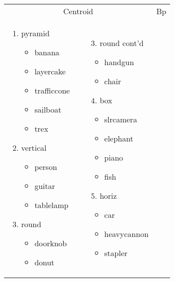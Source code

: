 \documentclass[12pt,twoside]{naturefigs}
\newif\myifpdf
\begin{document}
\begin{figure}
  \begin{tabular}{llll}
   \multicolumn{2}{c}{Centroid} & \multicolumn{2}{c}{Bp} \\
	 \parbox[t]{1.4in}{\raggedright  	{} \small
	\begin{enumerate}
	\item pyramid
	\begin{itemize}[leftmargin=*]
	\item banana
	\item layercake
	\item trafficcone
	\item sailboat
	\item trex
	\end{itemize}
	\item vertical
	\begin{itemize}[leftmargin=*]
	\item person
	\item guitar
	\item tablelamp
	\end{itemize}
	\item round
	\begin{itemize}[leftmargin=*]
	\item doorknob
	\item donut
	\end{itemize}
	\end{enumerate}
	} & 
	 \parbox[t]{1.4in}{\raggedright 	{} \small
	\begin{enumerate}
	\item[3.] round cont'd
	\begin{itemize}[leftmargin=*]
	\item handgun
	\item chair
	\end{itemize}
	\item[4.] box
	\begin{itemize}[leftmargin=*]
	\item slrcamera
	\item elephant
	\item piano
	\item fish
	\end{itemize}
	\item[5.] horiz
	\begin{itemize}[leftmargin=*]
	\item car
	\item heavycannon
	\item stapler

\end{itemize}
\end{enumerate}}
\end{tabular}
\end{figure}
\end{document}
